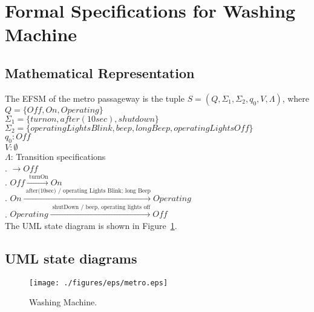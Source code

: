 \newpage
\section{Formal Specifications for Washing Machine}

\subsection{Mathematical Representation}

\noindent The EFSM of the metro passageway is the tuple $S = (Q, \Sigma_1, \Sigma_2, q_0, V, \Lambda)$, where\\

\noindent $Q = \{Off, On, Operating\}$\\
\noindent $\Sigma_1 = \{turn on, after(10sec), shut down\}$\\
\noindent $\Sigma_2 = \{operating Lights Blink, beep, long Beep, operating Lights Off\}$\\
\noindent $q_0: Off$\\
\noindent $V: \emptyset$\\
\noindent $\Lambda$: Transition specifications\\
. $\rightarrow Off$\\
. $Off \xrightarrow {\text { turnOn}} On$\\
. $On \xrightarrow {\text { after(10sec) / operating Lights Blink; long Beep}} Operating$\\
. $Operating \xrightarrow {\text { shutDown / beep, operating lights off}} Off$\\

\noindent The UML state diagram is shown in Figure~\ref{fig:metro-fig}.

\newpage

\subsection{UML state diagrams}

\begin{figure}[h!]
	\centering
		\texttt{[image: ./figures/eps/metro.eps]}
		  \caption{Washing Machine.}
  \label{fig:metro-fig}
\end{figure}




